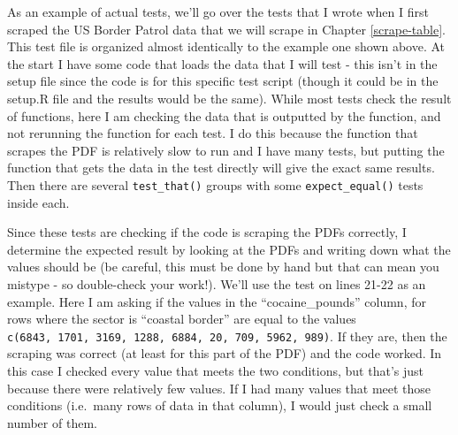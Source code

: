 \documentclass[
]{krantz}
\begin{document}
As an example of actual tests, we'll go over the tests that
I wrote when I first scraped the US Border Patrol data that
we will scrape in Chapter \ref{scrape-table}. This test file
is organized almost identically to the example one shown
above. At the start I have some code that loads the data
that I will test - this isn't in the setup file since the
code is for this specific test script (though it could be in
the setup.R file and the results would be the same). While
most tests check the result of functions, here I am checking
the data that is outputted by the function, and not
rerunning the function for each test. I do this because the
function that scrapes the PDF is relatively slow to run and
I have many tests, but putting the function that gets the
data in the test directly will give the exact same results.
Then there are several \texttt{test\_that()} groups with
some \texttt{expect\_equal()} tests inside each.

Since these tests are checking if the code is scraping the
PDFs correctly, I determine the expected result by looking
at the PDFs and writing down what the values should be (be
careful, this must be done by hand but that can mean you
mistype - so double-check your work!). We'll use the test on
lines 21-22 as an example. Here I am asking if the values in
the ``cocaine\_pounds'' column, for rows where the sector is
``coastal border'' are equal to the values
\texttt{c(6843,\ 1701,\ 3169,\ 1288,\ 6884,\ 20,\ 709,\ 5962,\ 989)}.
If they are, then the scraping was correct (at least for
this part of the PDF) and the code worked. In this case I
checked every value that meets the two conditions, but
that's just because there were relatively few values. If I
had many values that meet those conditions (i.e.~many rows
of data in that column), I would just check a small number
of them.
\end{document}
